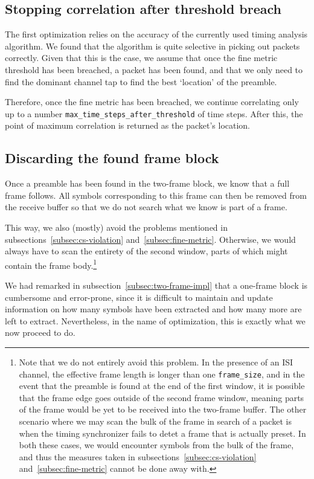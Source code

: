 \subsection{Stopping correlation after threshold breach}
\label{subsec:stop-corr}

The first optimization relies on the accuracy of the currently used timing
analysis algorithm. We found that the algorithm is quite selective in picking
out packets correctly. Given that this is the case, we assume that once the
fine metric threshold has been breached, a packet has been found, and that we
only need to find the dominant channel tap to find the best `location' of the
preamble.

Therefore, once the fine metric has been breached, we continue correlating only
up to a number \verb+max_time_steps_after_threshold+ of time steps. After this,
the point of maximum correlation is returned as the packet's location.

\subsection{Discarding the found frame block}
\label{subsec:frame-discard}

Once a preamble has been found in the two-frame block, we know that a full
frame follows. All symbols corresponding to this frame can then be removed from
the receive buffer so that we do not search what we know is part of a frame.

This way, we also (mostly) avoid the problems mentioned in
subsections~\ref{subsec:cs-violation} and~\ref{subsec:fine-metric}. Otherwise,
we would always have to scan the entirety of the second window, parts of which
might contain the frame body.\footnote{Note that we do not entirely avoid this
problem. In the presence of an ISI channel, the effective frame length is
longer than one \verb+frame_size+, and in the event that the preamble is found
at the end of the first window, it is possible that the frame edge goes outside
of the second frame window, meaning parts of the frame would be yet to be
received into the two-frame buffer. The other scenario where we may scan the
bulk of the frame in search of a packet is when the timing synchronizer fails
to detet a frame that is actually preset. In both these cases, we would
encounter symbols from the bulk of the frame, and thus the measures taken in
subsections~\ref{subsec:cs-violation} and~\ref{subsec:fine-metric} cannot be
done away with.}

We had remarked in subsection~\ref{subsec:two-frame-impl} that a one-frame
block is cumbersome and error-prone, since it is difficult to maintain and
update information on how many symbols have been extracted and how many more
are left to extract. Nevertheless, in the name of optimization, this is
exactly what we now proceed to do.

